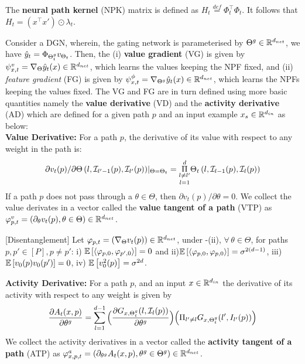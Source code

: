 \begin{lemma}\label{lm:npk}
The \textbf{neural path kernel} (NPK) matrix is defined as $H_t\stackrel{def}=\Phi^\top_t\Phi_t$. It follows that $H_t= (x^\top x')\odot\lambda_t$. 
\end{lemma}
Consider a DGN, wherein, the gating network is parameterised by ${\Theta}^g\in\mathbb{R}^{d_{net}}$,  we have $\hat{y}_t=\Phi_{{\Theta}^g_t}v_{\Theta_t}$. Then, the (i) \textbf{value gradient} (VG) is given by $\psi^v_{x,t}=\nabla_{\Theta} \hat{y}_t(x)\in\mathbb{R}^{d_{net}}$, which learns the values keeping the NPF fixed, and (ii)  \emph{feature gradient} (FG) is given by $\psi^{\phi}_{x,t}=\nabla_{{\Theta}^g} \hat{y}_t(x)\in\mathbb{R}^{d_{net}}$, which learns the NPFs keeping the values fixed. The VG and FG are in turn defined using more basic quantities namely the \textbf{value derivative} (VD) and the \textbf{activity derivative} (AD) which are defined for a given path $p$ and an input example $x_s\in\mathbb{R}^{d_{in}}$ as below:\\
\textbf{Value Derivative:} For a path $p$, the derivative of its value with respect to any weight in the path is: 
\begin{align}\label{eq:vft}{\partial v_t(p)}/{\partial \Theta\left(l,\mathcal{I}_{l'-1}(p),\mathcal{I}_{l'}(p)\right)}|_{\Theta=\Theta_t}= \underset{l=1}{\underset{l\neq l'}{\overset{d}{\Pi}}} \Theta_t\left(l,\mathcal{I}_{l-1}(p),\mathcal{I}_{l}(p)\right)
\end{align}
If a path $p$ does not pass through a $\theta\in\Theta$, then ${\partial v_t(p)}/{\partial \theta}=0$. We collect the value derivates in a vector called the \textbf{value tangent of a path} (VTP) as $\varphi^v_{p,t}=(\partial_{\theta}v_t(p),\theta\in\Theta)\in\mathbb{R}^{d_{net}}$.
\begin{lemma}\label{lm:disentangle}[Disentanglement] Let $\varphi_{p,t}=(\nabla_{\Theta} v_t(p))\in\mathbb{R}^{d_{net}}$, 
under -(ii), $\forall\,\theta\in\Theta$, for paths $p,p'\in [P], p\neq p'$:  i) $\mathbb{E}\left[\langle \varphi_{p,0},\varphi_{p',0}\rangle\right]= 0$ and ii)$\mathbb{E}\left[\langle \varphi_{p,0},\varphi_{p,0}\rangle\right]= \sigma^{2(d-1)}$, iii) $\mathbb{E}\left[v_0(p)v_0(p')\right]=0$, iv) $\mathbb{E}\left[v^2_0(p)\right]=\sigma^{2d}$.
\end{lemma}
\textbf{Activity Derivative:} For a path $p$, and an input $x\in\mathbb{R}^{d_{in}}$ the derivative of its activity with respect to any weight is given by 
\begin{align}
\frac{\partial A_{t}(x,p)}{\partial \theta^g}= \sum_{l=1}^{d-1} \Big(\frac{\partial G_{x,{\Theta}^g_t}(l,\mathcal{I}_l(p))}{\partial \theta^g} \Big)\Big(\Pi_{l'\neq l} G_{x,{\Theta}^g_t}(l',I_{l'}(p))\Big)
\end{align}
We collect the activity derivatives in a vector called the \textbf{activity tangent of a path} (ATP) as $\varphi^a_{x,p,t}=(\partial_{\theta^g}A_t(x,p),\theta^g\in{\Theta}^g)\in\mathbb{R}^{d_{net}}$.

